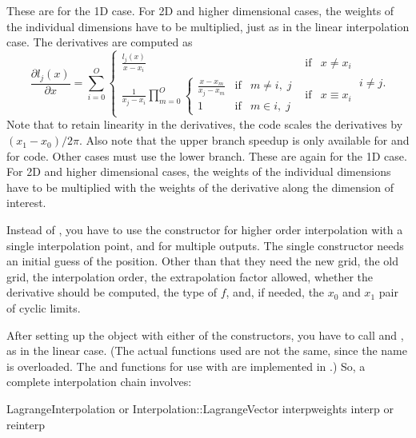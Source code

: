 These are for the 1D case. For 2D and higher dimensional cases, the weights of
the individual dimensions have to be multiplied, just as in the linear
interpolation case.
The derivatives are computed as
\begin{equation}
 \frac{\partial l_j(x)}{\partial x} = \sum_{i=0}^{O}
 \left\{
 \begin{array}{lcr}
  \frac{l_j(x)}{x - x_i} & \mathrm{if} & x \neq x_i \\
  \frac{1}{x_j - x_i} \prod_{m=0}^O
  \left\{
  \begin{array}{lcr}
   \frac{x - x_m}{x_j - x_m} & \mathrm{if} & m \neq i,\; j \\
   1 & \mathrm{if} & m \in i,\; j
  \end{array} \right. & \mathrm{if} & x \equiv x_i
 \end{array}
 \right. \; i \neq j.
\end{equation}
Note that to retain linearity in the derivatives, the  code
scales the derivatives by $(x_1 - x_0) / 2\pi$.  Also note that the upper branch
speedup is only available for  and for  code.
Other cases must use the lower branch.
These are again for the 1D case. For 2D and higher dimensional cases, the weights of
the individual dimensions have to be multiplied with the weights of the derivative
along the dimension of interest.

Instead of , you have to use the constructor
 for higher order interpolation
with a single interpolation point, and 
for multiple outputs. The single constructor needs an
initial guess of the position.  Other than that they need the new grid,
the old grid, the interpolation order, the extrapolation factor allowed,
whether the derivative should be computed, the type of $f$, and, if needed,
the $x_0$ and $x_1$ pair of cyclic limits.

After setting up the  object with
either of the constructors, you have to call 
and , as in the linear case. (The actual
functions used are not the same, since the name is overloaded. The
 and  functions for use
with  are implemented in
.) So, a complete interpolation chain
involves:

\begin{code}
LagrangeInterpolation or Interpolation::LagrangeVector
interpweights
interp or reinterp
\end{code}

